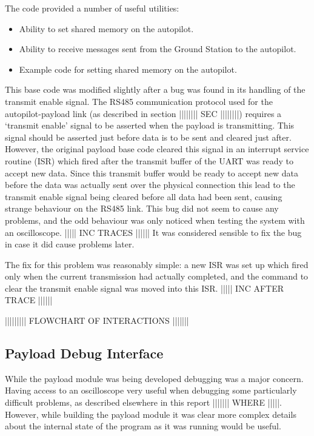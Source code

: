 The code provided a number of useful utilities:
\begin{itemize}
\item Ability to set shared memory on the autopilot.

\item Ability to receive messages sent from the Ground Station to the 
autopilot.

\item Example code for setting shared memory on the autopilot.
\end{itemize}

This base code was modified slightly after a bug was found in its handling of 
the transmit enable signal. The RS485 communication protocol used for the 
autopilot-payload link (as described in section |||||||| SEC ||||||||) 
requires a `transmit enable' signal to be asserted when the payload is 
transmitting. This signal should be asserted just before data is to be sent 
and cleared just after. However, the original payload base code cleared this 
signal in an interrupt service routine (ISR) which fired after the transmit 
buffer of the UART was ready to accept new data. Since this transmit buffer 
would be ready to accept new data before the data was actually sent over the
physical connection this lead to the transmit enable signal being cleared
before all data had been sent, causing strange behaviour on the RS485 link.
This bug did not seem to cause any problems, and the odd behaviour was only
noticed when testing the system with an oscilloscope. ||||| INC TRACES ||||||
It was considered sensible to fix the bug in case it did cause problems later.

The fix for this problem was reasonably simple: a new ISR was set up which 
fired only when the current transmission had actually completed, and the 
command to clear the transmit enable signal was moved into this ISR.
||||| INC AFTER TRACE ||||||


||||||||| FLOWCHART OF INTERACTIONS |||||||

\subsection{Payload Debug Interface}
\label{sec:payload_debug_interface}
While the payload module was being developed debugging was a major concern. 
Having access to an oscilloscope very useful when debugging some particularly 
difficult problems, as described elsewhere in this report ||||||| WHERE |||||.
However, while building the payload module it was clear more complex details 
about the internal state of the program as it was running would be useful.

